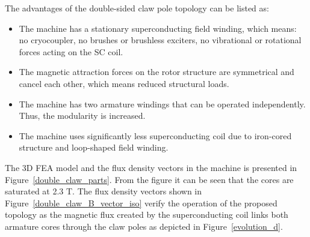 \documentclass[12pt]{iopart}
\begin{document}
The advantages of the double-sided claw pole topology can be listed as:

\begin{itemize}
  \item The machine has a stationary superconducting field winding, which means: no cryocoupler, no brushes or brushless exciters, no vibrational or rotational forces acting on the SC coil.
  \item The magnetic attraction forces on the rotor structure are symmetrical and cancel each other, which means reduced structural loads.
  \item The machine has two armature windings that can be operated independently. Thus, the modularity is increased.
  \item The machine uses significantly less superconducting coil due to iron-cored structure and loop-shaped field winding.
\end{itemize}

The 3D FEA model and the flux density vectors in the machine is presented in Figure~\ref{double_claw_parts}. From the figure it can be seen that the cores are saturated at 2.3 T. The flux density vectors shown in Figure~\ref{double_claw_B_vector_iso} verify the operation of the proposed topology as the magnetic flux created by the superconducting coil links both armature cores through the claw poles as depicted in Figure~\ref{evolution_d}.
\end{document}
